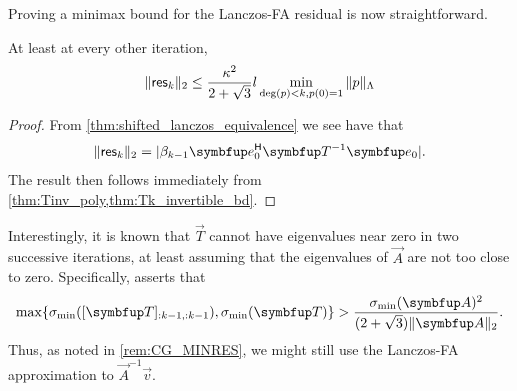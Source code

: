 Proving a minimax bound for the Lanczos-FA residual is now straightforward.
\begin{theorem}
At least at every other iteration,
\begin{equation*}
    \| \textup{\textsf{res}}_k \|_2 
    \leq \frac{\kappa^2}{2+\sqrt{3}}l\min_{\deg(p)<k, p(0)=1} \| p \|_{\Lambda}
\end{equation*}
\end{theorem}

\begin{proof}
From \cref{thm:shifted_lanczos_equivalence} we see have that
\begin{equation*}
    \| \res_k \|_2
    = |\beta_{k-1} \vec{e}_0^\cT \vec{T}^{-1} \vec{e}_0|.
\end{equation*}
The result then follows immediately from \cref{thm:Tinv_poly,thm:Tk_invertible_bd}.
\end{proof}



Interestingly, it is known that $\vec{T}$ cannot have eigenvalues near zero in two successive iterations, at least assuming that the eigenvalues of $\vec{A}$ are not too close to zero.
Specifically,  \cite[Equation 3.10]{greenbaum_druskin_knizhnerman_99} asserts that
\begin{equation}
    \label{eqn:nodoublezeroT}
\max\{ \sigma_{\textup{min}}([\vec{T}]_{:k-1,:k-1}),\sigma_{\textup{min}}(\vec{T})\} > \frac{\sigma_{\textup{min}}\A^2}{(2+\sqrt{3})\|\vec{A}\|_2}.
\end{equation}
Thus, as noted in \cref{rem:CG_MINRES}, we might still use the Lanczos-FA approximation to \( \vec{A}^{-1} \vec{v} \).



